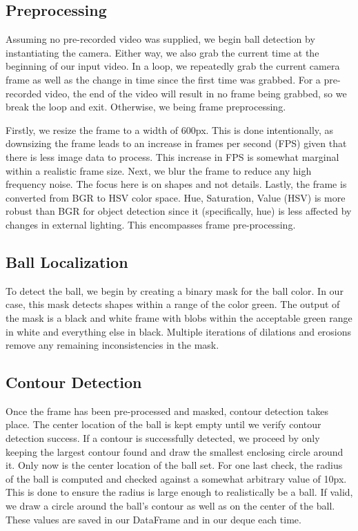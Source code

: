 \documentclass[10pt,twocolumn]{article}
\begin{document}
\subsection{Preprocessing}
Assuming no pre-recorded video was supplied, we begin ball detection by instantiating the camera.
Either way, we also grab the current time at the beginning of our input video.
In a loop, we repeatedly grab the current camera frame as well as the change in time since the first time was grabbed.
For a pre-recorded video, the end of the video will result in no frame being grabbed, so we break the loop and exit.
Otherwise, we being frame preprocessing. \par

Firstly, we resize the frame to a width of 600px.
This is done intentionally, as downsizing the frame leads to an increase in frames per second (FPS) given that there is less image data to process.
This increase in FPS is somewhat marginal within a realistic frame size.
Next, we blur the frame to reduce any high frequency noise.
The focus here is on shapes and not details.
Lastly, the frame is converted from BGR to HSV color space.
Hue, Saturation, Value (HSV) is more robust than BGR for object detection since it (specifically, hue) is less affected by changes in external lighting. 
This encompasses frame pre-processing.\par

\subsection{Ball Localization}
To detect the ball, we begin by creating a binary mask for the ball color.
In our case, this mask detects shapes within a range of the color green.
The output of the mask is a black and white frame with blobs within the acceptable green range in white and everything else in black.
Multiple iterations of dilations and erosions remove any remaining inconsistencies in the mask.

\subsection{Contour Detection}
Once the frame has been pre-processed and masked, contour detection takes place.
The center location of the ball is kept empty until we verify contour detection success.
If a contour is successfully detected, we proceed by only keeping the largest contour found and draw the smallest enclosing circle around it.
Only now is the center location of the ball set.
For one last check, the radius of the ball is computed and checked against a somewhat arbitrary value of 10px.
This is done to ensure the radius is large enough to realistically be a ball. 
If valid, we draw a circle around the ball's contour as well as on the center of the ball.
These values are saved in our DataFrame and in our deque each time.\par
\end{document}
